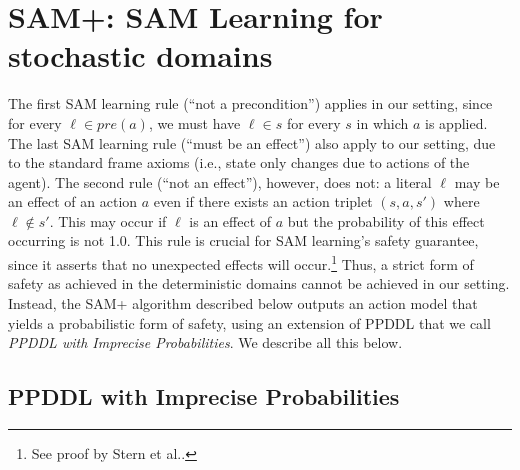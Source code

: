 \documentclass[letterpaper]{article} %
\newcommand{\pre}{\textit{pre}}
\newcommand{\tuple}[1]{\ensuremath{\left \langle #1 \right \rangle }}
\begin{document}
\section{SAM+: SAM Learning for stochastic domains}



The first SAM learning rule (``not a precondition'') applies in our setting, since for every $\ell\in\pre(a)$, we must have $\ell\in s$ for every $s$ in which $a$ is applied. 
The last SAM learning rule (``must be an effect'') also apply to our setting, due to the standard frame axioms (i.e., state only changes due to actions of the agent). 
The second rule (``not an effect''), however, does not: a literal $\ell$ may be an effect of an action $a$ even if there exists an action triplet $(s,a,s')$ where $\ell\notin s'$. 
This may occur if $\ell$ is an effect of $a$ but the probability of this effect occurring is not 1.0. 
This rule is crucial for SAM learning's safety guarantee, since it asserts that no unexpected effects will occur.\footnote{See proof by Stern et al..} 
Thus, a strict form of safety as achieved in the deterministic domains cannot be achieved in our setting. 
Instead, the SAM+ algorithm described below outputs an action model that
yields a probabilistic form of safety, using an extension of PPDDL that we call \emph{PPDDL with Imprecise Probabilities}. 
We describe all this below. 



\subsection{PPDDL with Imprecise Probabilities}
\end{document}
